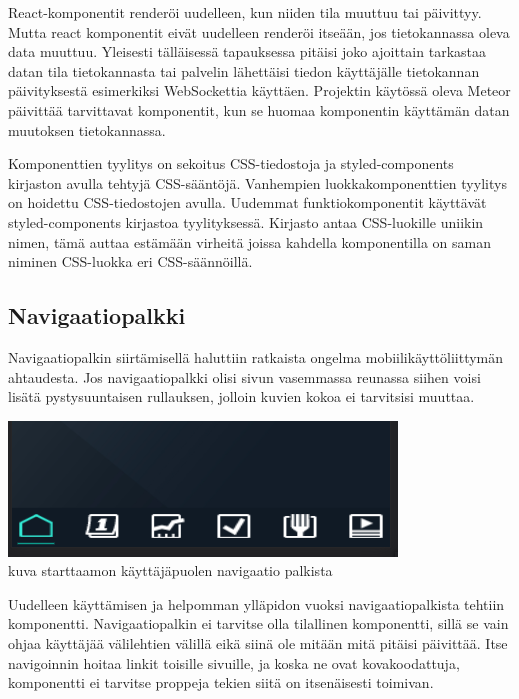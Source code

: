 \documentclass[11pt,a4paper,titlepage,oneside]{article}
\begin{document}
React-komponentit renderöi uudelleen, kun niiden tila muuttuu tai päivittyy. Mutta react komponentit eivät uudelleen renderöi itseään, jos tietokannassa oleva data muuttuu. 
Yleisesti tälläisessä tapauksessa pitäisi joko ajoittain tarkastaa datan tila tietokannasta tai palvelin lähettäisi tiedon käyttäjälle tietokannan päivityksestä esimerkiksi WebSockettia käyttäen.
Projektin käytössä oleva Meteor päivittää tarvittavat komponentit, kun se huomaa komponentin käyttämän datan muutoksen tietokannassa.\medskip

Komponenttien tyylitys on sekoitus CSS-tiedostoja ja styled-components kirjaston avulla tehtyjä CSS-sääntöjä.
Vanhempien luokkakomponenttien tyylitys on hoidettu CSS-tiedostojen avulla.
Uudemmat funktiokomponentit käyttävät styled-components kirjastoa tyylityksessä. Kirjasto antaa CSS-luokille uniikin nimen, tämä auttaa estämään virheitä joissa kahdella komponentilla on saman niminen CSS-luokka eri CSS-säännöillä.\medskip



\subsection*{ Navigaatiopalkki }

Navigaatiopalkin siirtämisellä haluttiin ratkaista ongelma mobiilikäyttöliittymän ahtaudesta. Jos navigaatiopalkki olisi sivun vasemmassa reunassa siihen voisi lisätä pystysuuntaisen rullauksen, jolloin kuvien kokoa ei tarvitsisi muuttaa.
\medskip



\includegraphics{src/public/starttaamohomenavbar.png} \\
kuva starttaamon käyttäjäpuolen navigaatio palkista \medskip

Uudelleen käyttämisen ja helpomman ylläpidon vuoksi navigaatiopalkista tehtiin komponentti.
Navigaatiopalkin ei tarvitse olla tilallinen komponentti, sillä se vain ohjaa käyttäjää välilehtien välillä eikä siinä ole mitään mitä pitäisi päivittää.
Itse navigoinnin hoitaa linkit toisille sivuille, ja koska ne ovat kovakoodattuja, komponentti ei tarvitse proppeja tekien siitä on itsenäisesti toimivan. 
\medskip
\end{document}
